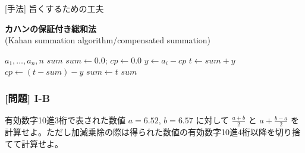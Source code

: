 \documentclass[dvipdfmx,aspectratio=169,20pt]{beamer}
\newcommand{\firstreportid}[0]{I}
\begin{document}
\begin{frame}{{\large [手法] 旨くするための工夫}}
    \begin{block}{{\bf\small カハンの保証付き総和法}\\
    \vspace{-5mm}
    {\fontsize{13pt}{18pt}\selectfont (Kahan summation algorithm/compensated summation)}}
        {\fontsize{15pt}{18pt}\selectfont
        \begin{algorithmic}[1]
            \REQUIRE $a_1,\dots,a_n,n$
            \ENSURE $sum$
            \STATE $sum \leftarrow 0.0$; $cp \leftarrow 0.0$
            \STATE $y \leftarrow a_i - cp$
            \STATE $t \leftarrow sum + y$
            \STATE $cp \leftarrow (t-sum) - y$
            \STATE $sum \leftarrow t$
            \ENDFOR
            \RETURN $sum$
        \end{algorithmic}
        }
    \end{block}
\end{frame}
\begin{frame}
\frametitle{[問題] \firstreportid-B}
有効数字10進3桁で表された数値 $a=6.52$, $b=6.57$ に対して $\frac{a+b}{2}$ と $a+\frac{b-a}{2}$ を計算せよ。ただし加減乗除の際は得られた数値の有効数字10進4桁以降を切り捨てて計算せよ。
\end{frame}
\end{document}
